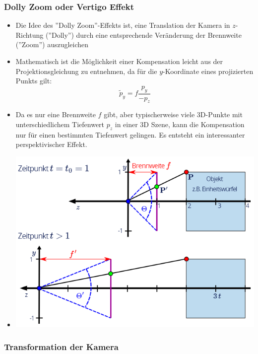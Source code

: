 \documentclass{scrartcl}
\begin{document}
\subsubsection{Dolly Zoom oder Vertigo Effekt}

\begin{itemize}
	\item Die Idee des ''Dolly Zoom''-Effekts ist, eine Translation der Kamera in $z$-Richtung (''Dolly'') durch eine entsprechende Veränderung der Brennweite (''Zoom'') auszugleichen
	\item Mathematisch ist die Möglichkeit einer Kompensation leicht aus der Projektionsgleichung zu entnehmen, da für die $y$-Koordinate eines projizierten Punkts gilt: \\
	\begin{equation}
		\widetilde{p}_y = f \frac{p_y}{-p_z}
	\end{equation}
	\item Da es nur eine Brennweite $f$ gibt, aber typischerweise viele 3D-Punkte mit unterschiedlichem Tiefenwert $p_z$ in einer 3D Szene, kann die Kompensation nur für einen bestimmten Tiefenwert gelingen. Es entsteht ein interessanter perspektivischer Effekt.
	\item[] \includegraphics[scale=0.5]{figures/dolly_zoom.png}
\end{itemize}

\subsubsection{Transformation der Kamera}
\end{document}
